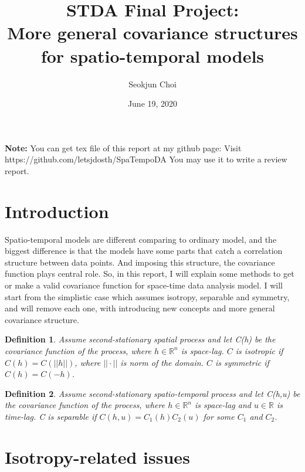 \documentclass{article}
\newtheorem*{definition}{Definition}
\begin{document}
\title{STDA Final Project: \\ More general covariance structures for spatio-temporal models}
\author{Seokjun Choi}
\date{June 19, 2020}
\maketitle

\textbf{Note:}
You can get tex file of this report at my github page: Visit https://github.com/letsjdosth/SpaTempoDA
You may use it to write a review report.

\section{Introduction}

Spatio-temporal models are different comparing to ordinary model, and the biggest difference is that
the models have some parts that catch a correlation structure between data points.
And imposing this structure, the covariance function plays central role.
So, in this report, I will explain some methods to get or make a valid covariance function for space-time data analysis model.
I will start from the simplistic case which assumes isotropy, separable and symmetry,
and will remove each one, with introducing new concepts and more general covariance structure.
\begin{definition}
    Assume second-stationary spatial process and let C(h) be the covariance function of the process, where $h\in\mathbb R^n$ is space-lag.
    $C$ is isotropic if $C(h)=C(||h||)$, where $||\cdot||$ is norm of the domain.
    $C$ is symmetric if $C(h)=C(-h)$.
\end{definition}
\begin{definition}
    Assume second-stationary spatio-temporal process and let C(h,u) be the covariance function of the process, where $h\in\mathbb R^n$ is space-lag and $u\in\mathbb R$ is time-lag.
    C is separable if $C(h,u)=C_1(h)C_2(u)$ for some $C_1$ and $C_2$.
\end{definition}

\section{Isotropy-related issues}
\end{document}
